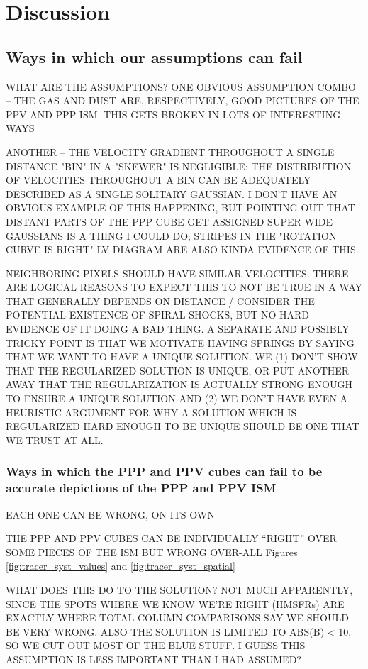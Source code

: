 \section{Discussion}
\label{sec:discussion}

\subsection{Ways in which our assumptions can fail}
\label{sec:discussion-systematics}
WHAT ARE THE ASSUMPTIONS?
ONE OBVIOUS ASSUMPTION COMBO -- THE GAS AND DUST ARE, RESPECTIVELY, GOOD PICTURES OF THE PPV AND PPP ISM. THIS GETS BROKEN IN LOTS OF INTERESTING WAYS

ANOTHER -- THE VELOCITY GRADIENT THROUGHOUT A SINGLE DISTANCE "BIN" IN A "SKEWER" IS NEGLIGIBLE; THE DISTRIBUTION OF VELOCITIES THROUGHOUT A BIN CAN BE ADEQUATELY DESCRIBED AS A SINGLE SOLITARY GAUSSIAN. I DON'T HAVE AN OBVIOUS EXAMPLE OF THIS HAPPENING, BUT POINTING OUT THAT DISTANT PARTS OF THE PPP CUBE GET ASSIGNED SUPER WIDE GAUSSIANS IS A THING I COULD DO; STRIPES IN THE "ROTATION CURVE IS RIGHT" LV DIAGRAM ARE ALSO KINDA EVIDENCE OF THIS.

NEIGHBORING PIXELS SHOULD HAVE SIMILAR VELOCITIES. THERE ARE LOGICAL REASONS TO EXPECT THIS TO NOT BE TRUE IN A WAY THAT GENERALLY DEPENDS ON DISTANCE / CONSIDER THE POTENTIAL EXISTENCE OF SPIRAL SHOCKS, BUT NO HARD EVIDENCE OF IT DOING A BAD THING. A SEPARATE AND POSSIBLY TRICKY POINT IS THAT WE MOTIVATE HAVING SPRINGS BY SAYING THAT WE WANT TO HAVE A UNIQUE SOLUTION. WE (1) DON'T SHOW THAT THE REGULARIZED SOLUTION IS UNIQUE, OR PUT ANOTHER AWAY THAT THE REGULARIZATION IS ACTUALLY STRONG ENOUGH TO ENSURE A UNIQUE SOLUTION AND (2) WE DON'T HAVE EVEN A HEURISTIC ARGUMENT FOR WHY A SOLUTION WHICH IS REGULARIZED HARD ENOUGH TO BE UNIQUE SHOULD BE ONE THAT WE TRUST AT ALL.


\subsubsection{Ways in which the PPP and PPV cubes can fail to be accurate depictions of the PPP and PPV ISM}
EACH ONE CAN BE WRONG, ON ITS OWN

THE PPP AND PPV CUBES CAN BE INDIVIDUALLY ``RIGHT'' OVER SOME PIECES OF THE ISM BUT WRONG OVER-ALL 
Figures \ref{fig:tracer_syst_values} and \ref{fig:tracer_syst_spatial}

WHAT DOES THIS DO TO THE SOLUTION? NOT MUCH APPARENTLY, SINCE THE SPOTS WHERE WE KNOW WE'RE RIGHT (HMSFRs) ARE EXACTLY WHERE TOTAL COLUMN COMPARISONS SAY WE SHOULD BE VERY WRONG. ALSO THE SOLUTION IS LIMITED TO ABS(B) < 10, SO WE CUT OUT MOST OF THE BLUE STUFF. I GUESS THIS ASSUMPTION IS LESS IMPORTANT THAN I HAD ASSUMED? 

